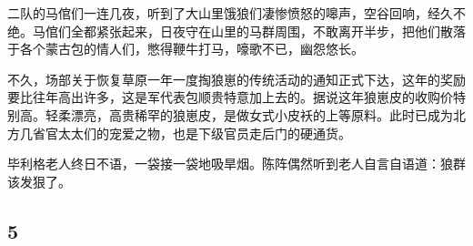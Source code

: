 \par 二队的马倌们一连几夜，听到了大山里饿狼们凄惨愤怒的嗥声，空谷回响，经久不绝。马倌们全都紧张起来，日夜守在山里的马群周围，不敢离开半步，把他们散落于各个蒙古包的情人们，憋得鞭牛打马，嚎歌不已，幽怨悠长。
\par 不久，场部关于恢复草原一年一度掏狼崽的传统活动的通知正式下达，这年的奖励要比往年高出许多，这是军代表包顺贵特意加上去的。据说这年狼崽皮的收购价特别高。轻柔漂亮，高贵稀罕的狼崽皮，是做女式小皮袄的上等原料。此时已成为北方几省官太太们的宠爱之物，也是下级官员走后门的硬通货。
\par 毕利格老人终日不语，一袋接一袋地吸旱烟。陈阵偶然听到老人自言自语道：狼群该发狠了。





\subsection*{5}


